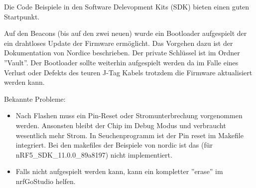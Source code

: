 \documentclass[11pt,ngerman]{scrartcl} %
\begin{document}
Die Code Beispiele in den Software Delevopment Kits (SDK) bieten einen guten Startpunkt. 

Auf den Beacons (bis auf den zwei neuen) wurde ein Bootloader aufgespielt der ein drahtloses Update der Firmware ermöglicht. Das Vorgehen dazu ist der Dokumentation von Nordice beschrieben. Der private Schlüssel ist im Ordner ''Vault''. Der Bootloader sollte weiterhin aufgespielt werden da im Falle eines Verlust oder Defekts des teuren J-Tag Kabels trotzdem die Firmware aktualisiert werden kann.


Bekannte Probleme:
\begin{itemize}
\item  Nach Flashen muss ein Pin-Reset oder Stromunterbrechung vorgenommen werden. Ansonsten bleibt der Chip im Debug Modus und verbraucht wesentlich mehr Strom.  In Seuchenprogramm ist der Pin reset im Makefile integriert. Bei den makefiles der Beispiele von nordic ist das (für nRF5\_SDK\_11.0.0\_89a8197) nicht implementiert.
\item Falls nicht aufgespielt werden kann, kann ein kompletter ''erase'' im nrfGoStudio helfen.
\end{itemize}
\end{document}
